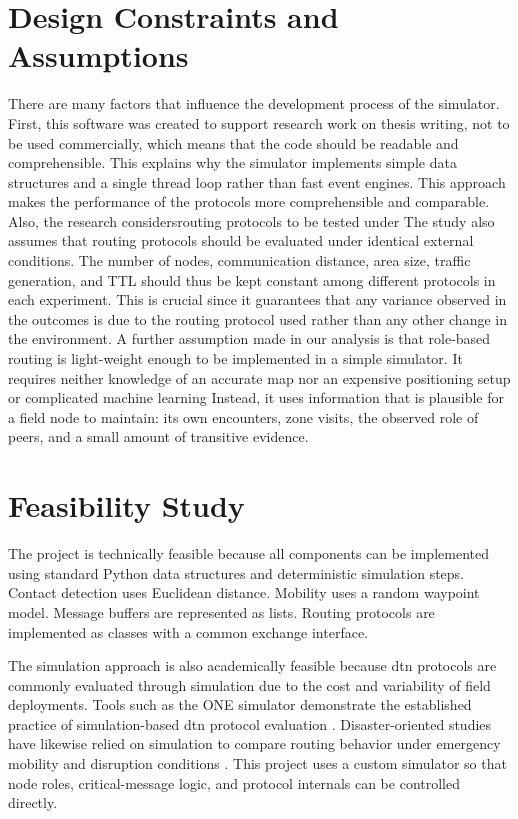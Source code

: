 \section{Design Constraints and Assumptions}
There are many factors that influence the development process of the simulator. First, this software was created to support research work on thesis writing, not to be used commercially, which means that the code should be readable and comprehensible. This explains why the simulator implements simple data structures and a single thread loop rather than fast event engines. This approach makes the performance of the protocols more comprehensible and comparable.
Also, the research considersrouting protocols to be tested under
The study also assumes that routing protocols should be evaluated under identical external conditions. The number of nodes, communication distance, area size, traffic generation,
and TTL should thus be kept constant among different protocols in each experiment.
This is crucial since it guarantees that any variance observed in the outcomes is due to
the routing protocol used rather than any other change in the environment.
A further assumption made in our analysis is that role-based routing is light-weight
enough to be implemented in a simple simulator. It requires neither knowledge of an
accurate map nor an expensive positioning setup or complicated machine learning Instead, it uses information that is plausible for a field node to maintain: its own encounters, zone visits, the observed role of peers, and a small amount of transitive evidence.

\section{Feasibility Study}
The project is technically feasible because all components can be implemented using standard Python data structures and deterministic simulation steps. Contact detection uses Euclidean distance. Mobility uses a random waypoint model. Message buffers are represented as lists. Routing protocols are implemented as classes with a common exchange interface.

The simulation approach is also academically feasible because \ac{dtn} protocols are commonly evaluated through simulation due to the cost and variability of field deployments. Tools such as the ONE simulator demonstrate the established practice of simulation-based \ac{dtn} protocol evaluation \citep{keranen2009one}. Disaster-oriented studies have likewise relied on simulation to compare routing behavior under emergency mobility and disruption conditions \citep{martincampillo2013disaster,rosasolivos2020csar}. This project uses a custom simulator so that node roles, critical-message logic, and protocol internals can be controlled directly.

